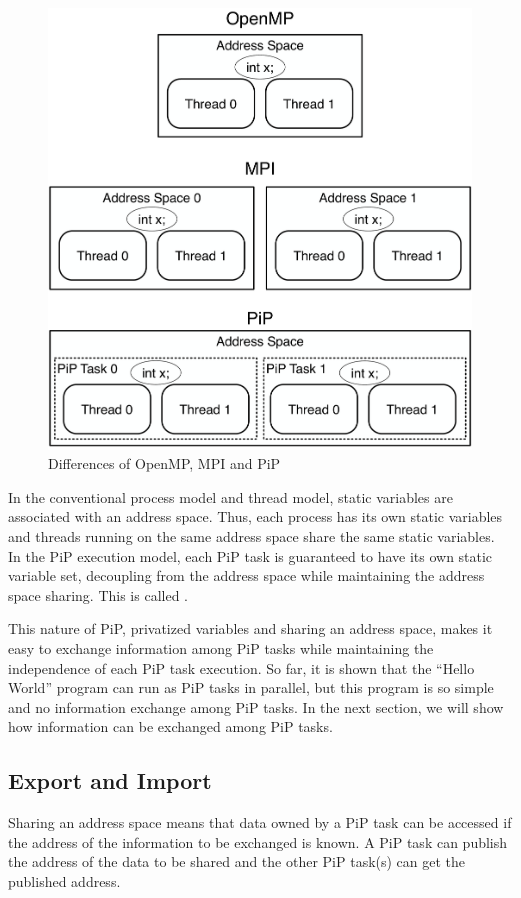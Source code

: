 \begin{figure}[ht]
\centering
\includegraphics[width=0.7\columnwidth]{tasks/Figs/AddressSpace-OpenMP-MPI-PiP.pdf}
\caption{Differences of OpenMP, MPI and PiP}
\label{fig:tasks:hello-var-omp}
\end{figure}

In the conventional process model and thread model, static variables
are associated with an address space. Thus, each process has its own
static variables and threads running on the same address space share
the same static variables. In the PiP execution model, each PiP task
is guaranteed to have its own static variable set, decoupling from the
address space while maintaining the address space sharing. This is
called {\bf {}}. 

This nature of PiP, privatized variables and sharing an address space,
makes it easy to exchange information among PiP tasks while
maintaining the independence of each PiP task execution. 
So far, it is shown that the ``Hello World'' program can run as PiP
tasks in parallel, but this program is so simple and no information
exchange among PiP tasks. In the next section, we will show how
information can be exchanged among PiP tasks.

\subsection{Export and Import}

Sharing an address space means that data owned by a PiP task
can be accessed if the address of the information to be exchanged is
known. A PiP task can publish the address of the data to be shared
and the other PiP task(s) can get the published address. 


